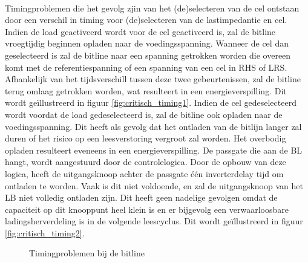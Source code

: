 \paragraph{}
Timingproblemen die het gevolg zjin van het (de)selecteren van de cel ontstaan door een verschil in timing voor (de)selecteren van de lastimpedantie en cel. Indien de load geactiveerd wordt voor de cel geactiveerd is, zal de bitline vroegtijdig beginnen opladen naar de voedingsspanning. Wanneer de cel dan geselecteerd is zal de bitline naar een spanning getrokken worden die overeen komt met de referentiespanning of een spanning van een cel in RHS of LRS. Afhankelijk van het tijdsverschill tussen deze twee gebeurtenissen, zal de bitline terug omlaag getrokken worden, wat resulteert in een energieverspilling. Dit wordt geïllustreerd in figuur \ref{fig:critisch_timing1}. Indien de cel gedeselecteerd wordt voordat de load gedeselecteerd is, zal de bitline ook opladen naar de voedingsspanning. Dit heeft als gevolg dat het ontladen van de bitlijn langer zal duren of het risico op een leesverstoring vergroot zal worden. Het overbodig opladen resulteert eveneens in een energieverspilling. De passgate die aan de BL hangt, wordt aangestuurd door de controlelogica. Door de opbouw van deze logica, heeft de uitgangsknoop achter de passgate één inverterdelay tijd om ontladen te worden. Vaak is dit niet voldoende, en zal de uitgangsknoop van het LB niet volledig ontladen zijn. Dit heeft geen nadelige gevolgen omdat de capaciteit op dit knooppunt heel klein is en er bijgevolg een verwaarloosbare ladingsherverdeling is in de volgende leescyclus. Dit wordt geïllustreerd in figuur \ref{fig:critisch_timing2}.  


\begin{figure}[ht]
\centering
{}
\caption[Timingproblemen bij de bitline]{Timingproblemen bij de bitline}
\clearpage
\end{figure}

